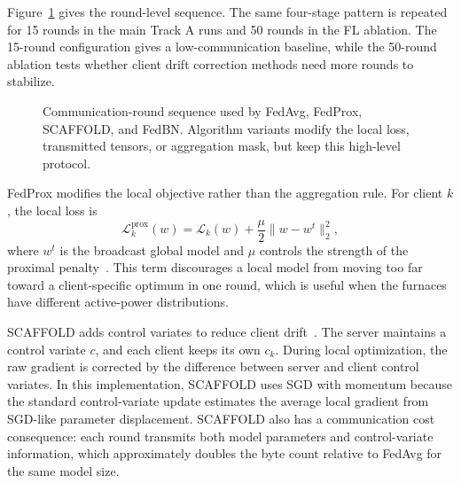 \documentclass[pdflatex,sn-mathphys-num]{sn-jnl}
\theoremstyle{thmstyleone}%
\theoremstyle{thmstyletwo}%
\theoremstyle{thmstylethree}%
\begin{document}
Figure~\ref{fig:round-sequence} gives the round-level sequence. The same four-stage pattern is repeated for 15 rounds in the main Track A runs and 50 rounds in the FL ablation. The 15-round configuration gives a low-communication baseline, while the 50-round ablation tests whether client drift correction methods need more rounds to stabilize.

\begin{figure}[H]
\centering
{}
\caption{Communication-round sequence used by FedAvg, FedProx, SCAFFOLD, and FedBN. Algorithm variants modify the local loss, transmitted tensors, or aggregation mask, but keep this high-level protocol.}
\label{fig:round-sequence}
\end{figure}

FedProx modifies the local objective rather than the aggregation rule. For client $k$, the local loss is
\begin{equation}
    \mathcal{L}^{\mathrm{prox}}_k(w)
    = \mathcal{L}_k(w) + \frac{\mu}{2}\lVert w - w^t\rVert_2^2 ,
    \label{eq:fedprox}
\end{equation}
where $w^t$ is the broadcast global model and $\mu$ controls the strength of the proximal penalty~\cite{li2020fedprox}. This term discourages a local model from moving too far toward a client-specific optimum in one round, which is useful when the furnaces have different active-power distributions.

SCAFFOLD adds control variates to reduce client drift~\cite{karimireddy2020scaffold}. The server maintains a control variate $c$, and each client keeps its own $c_k$. During local optimization, the raw gradient is corrected by the difference between server and client control variates. In this implementation, SCAFFOLD uses SGD with momentum because the standard control-variate update estimates the average local gradient from SGD-like parameter displacement. SCAFFOLD also has a communication cost consequence: each round transmits both model parameters and control-variate information, which approximately doubles the byte count relative to FedAvg for the same model size.
\end{document}
